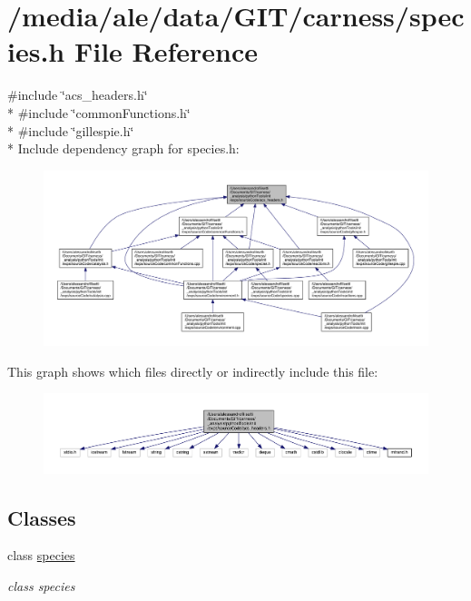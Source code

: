 \hypertarget{a00087}{\section{/media/ale/data/\-G\-I\-T/carness/species.h File Reference}
\label{a00087}
}
{\ttfamily \#include \char`\"{}acs\-\_\-headers.\-h\char`\"{}}\\*
{\ttfamily \#include \char`\"{}common\-Functions.\-h\char`\"{}}\\*
{\ttfamily \#include \char`\"{}gillespie.\-h\char`\"{}}\\*
Include dependency graph for species.\-h\-:\nopagebreak
\begin{figure}[H]
\begin{center}
\leavevmode
\includegraphics[width=350pt]{a00161}
\end{center}
\end{figure}
This graph shows which files directly or indirectly include this file\-:\nopagebreak
\begin{figure}[H]
\begin{center}
\leavevmode
\includegraphics[width=350pt]{a00162}
\end{center}
\end{figure}
\subsection*{Classes}
\begin{DoxyCompactItemize}
\item 
class \hyperlink{a00014}{species}
\begin{DoxyCompactList}\small\item\em class species \end{DoxyCompactList}\end{DoxyCompactItemize}
